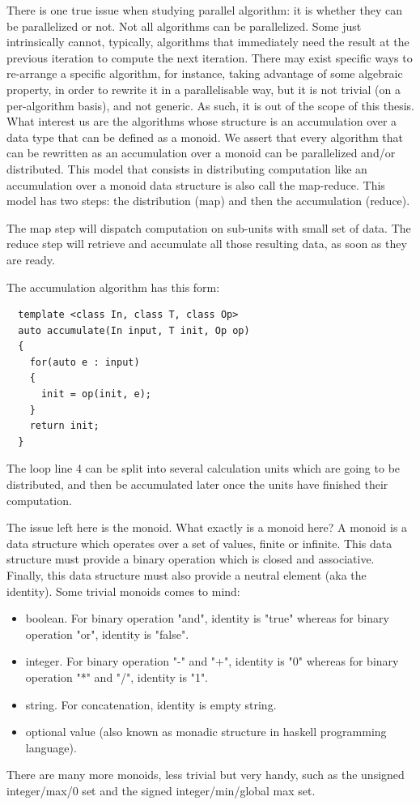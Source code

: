 There is one true issue when studying parallel algorithm: it is whether they can be parallelized or not. Not all
algorithms can be parallelized. Some just intrinsically cannot, typically, algorithms that immediately need the result
at the previous iteration to compute the next iteration. There may exist specific ways to re-arrange a specific
algorithm, for instance, taking advantage of some algebraic property, in order to rewrite it in a parallelisable way,
but it is not trivial (on a per-algorithm basis), and not generic. As such, it is out of the scope of this thesis. What
interest us are the algorithms whose structure is an accumulation over a data type that can be defined as a monoid. We
assert that every algorithm that can be rewritten as an accumulation over a monoid can be parallelized and/or
distributed. This model that consists in distributing computation like an accumulation over a monoid data structure is
also call the map-reduce. This model has two steps: the distribution (map) and then the accumulation (reduce).

The map step will dispatch computation on sub-units with small set of data. The reduce step will retrieve and accumulate
all those resulting data, as soon as they are ready.

The accumulation algorithm has this form:
\begin{verbatim}
  template <class In, class T, class Op>
  auto accumulate(In input, T init, Op op)
  {
    for(auto e : input)
    {
      init = op(init, e);
    }
    return init;
  }
\end{verbatim}

The loop line 4 can be split into several calculation units which are going to be distributed, and then be accumulated
later once the units have finished their computation.

The issue left here is the monoid. What exactly is a monoid here? A monoid is a data structure which operates over a set
of values, finite or infinite. This data structure must provide a binary operation which is closed and associative.
Finally, this data structure must also provide a neutral element (aka the identity). Some trivial monoids comes to mind:
\begin{itemize}
  \item boolean. For binary operation "and", identity is "true" whereas for binary operation "or", identity is "false".
  \item integer. For binary operation "-" and "+", identity is "0" whereas for binary operation "*" and "/", identity is
        "1".
  \item string. For concatenation, identity is empty string.
  \item optional value (also known as monadic structure in haskell programming language).
\end{itemize}
There are many more monoids, less trivial but very handy, such as the unsigned integer/max/0 set and the signed
integer/min/global max set.

